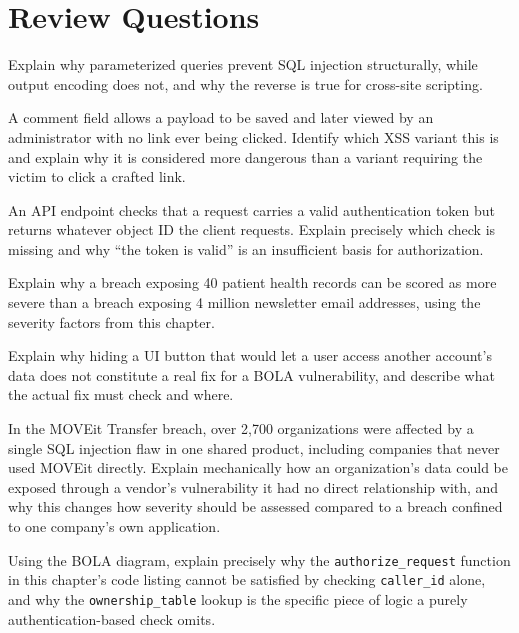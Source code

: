 \section*{Review Questions}
\begin{reviewquestions}
\item Explain why parameterized queries prevent SQL injection structurally, while output encoding
does not, and why the reverse is true for cross-site scripting.
\item A comment field allows a payload to be saved and later viewed by an administrator with no
link ever being clicked. Identify which XSS variant this is and explain why it is considered more
dangerous than a variant requiring the victim to click a crafted link.
\item An API endpoint checks that a request carries a valid authentication token but returns
whatever object ID the client requests. Explain precisely which check is missing and why
``the token is valid'' is an insufficient basis for authorization.
\item Explain why a breach exposing 40 patient health records can be scored as more severe than a
breach exposing 4 million newsletter email addresses, using the severity factors from this chapter.
\item Explain why hiding a UI button that would let a user access another account's data does not
constitute a real fix for a BOLA vulnerability, and describe what the actual fix must check and
where.
\item In the MOVEit Transfer breach, over 2{,}700 organizations were affected by a single SQL
injection flaw in one shared product, including companies that never used MOVEit directly. Explain
mechanically how an organization's data could be exposed through a vendor's vulnerability it had
no direct relationship with, and why this changes how severity should be assessed compared to a
breach confined to one company's own application.
\item Using the BOLA diagram, explain precisely why the \texttt{authorize\_request} function in
this chapter's code listing cannot be satisfied by checking \texttt{caller\_id} alone, and why the
\texttt{ownership\_table} lookup is the specific piece of logic a purely authentication-based check
omits.
\end{reviewquestions}

